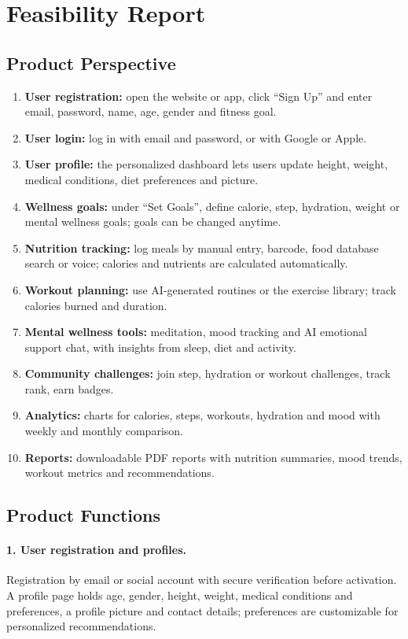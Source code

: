 \documentclass[11pt,a4paper]{report}
\begin{document}
\section{Feasibility Report}

\subsection{Product Perspective}
\begin{enumerate}
 \item \textbf{User registration:} open the website or app, click ``Sign Up'' and enter email, password, name, age, gender and fitness goal.
 \item \textbf{User login:} log in with email and password, or with Google or Apple.
 \item \textbf{User profile:} the personalized dashboard lets users update height, weight, medical conditions, diet preferences and picture.
 \item \textbf{Wellness goals:} under ``Set Goals'', define calorie, step, hydration, weight or mental wellness goals; goals can be changed anytime.
 \item \textbf{Nutrition tracking:} log meals by manual entry, barcode, food database search or voice; calories and nutrients are calculated automatically.
 \item \textbf{Workout planning:} use AI-generated routines or the exercise library; track calories burned and duration.
 \item \textbf{Mental wellness tools:} meditation, mood tracking and AI emotional support chat, with insights from sleep, diet and activity.
 \item \textbf{Community challenges:} join step, hydration or workout challenges, track rank, earn badges.
 \item \textbf{Analytics:} charts for calories, steps, workouts, hydration and mood with weekly and monthly comparison.
 \item \textbf{Reports:} downloadable PDF reports with nutrition summaries, mood trends, workout metrics and recommendations.
\end{enumerate}

\subsection{Product Functions}
\paragraph{1. User registration and profiles.} Registration by email or social account with secure verification before activation. A profile page holds age, gender, height, weight, medical conditions and preferences, a profile picture and contact details; preferences are customizable for personalized recommendations.
\end{document}
